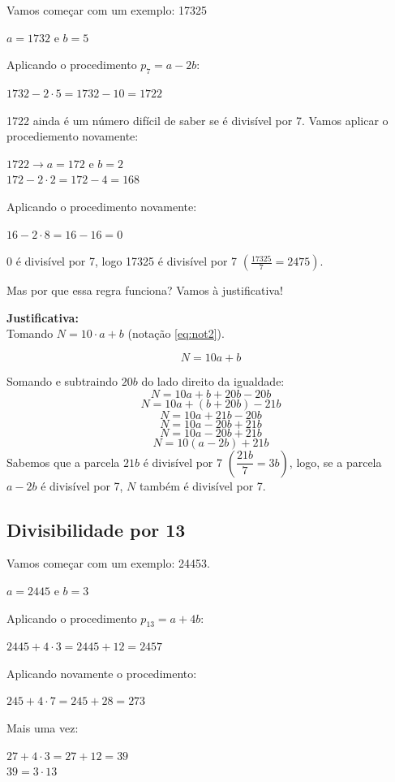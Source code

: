 \documentclass[12pt,a4paper]{article}
\begin{document}
		Vamos começar com um exemplo: 17325 
		
		$a = 1732$ e $b =5$
		
		Aplicando o procedimento $p_7 = a - 2b$:
		
		$1732 - 2 \cdot 5 = 1732 - 10 = 1722$
		
		1722 ainda é um número difícil de saber se é divisível por 7. Vamos aplicar o procediemento novamente:
		
		$1722 \longrightarrow a = 172$ e $b = 2$\\		
		$172 - 2 \cdot 2 = 172 - 4 = 168$
		
		Aplicando o procedimento novamente:
		
		$16 - 2 \cdot 8 = 16 - 16 = 0$
		
		0 é divisível por 7, logo 17325 é divisível por 7 $\left( \frac{17325}{7} = 2475 \right) $.
		
		Mas por que essa regra funciona? Vamos à justificativa!
		
		\textbf{Justificativa:}\\
		Tomando $N = 10 \cdot a + b$ (notação \ref{eq:not2}).
		
		$$N = 10a + b$$
		
		Somando e subtraindo $20b$ do lado direito da igualdade:		
		$$N = 10  a + b + 20b - 20b$$
		$$N = 10  a + (b + 20b) - 21b$$
		$$N = 10  a + 21b - 20b$$
		$$N = 10  a - 20b + 21b$$
		$$N = 10  a - 20b + 21b$$
		$$N = 10  (a - 2b) + 21b$$		
		Sabemos que a parcela $21b$ é divisível por 7 $\left(  \dfrac{21b}{7} = 3b \right) $, logo, se a parcela $a - 2b$ é divisível por 7, $N$ também é divisível por 7.
		
		\newpage
		
		\subsection{Divisibilidade por 13}
		
		Vamos começar com um exemplo: 24453.
		
		$a = 2445$ e $b =3$
		
		Aplicando o procedimento $p_{13} = a + 4b$:
		
		$2445 + 4 \cdot 3 = 2445 + 12 = 2457$
		
		Aplicando novamente o procedimento:
		
		$245 + 4 \cdot 7 = 245 + 28 = 273$
		
		Mais uma vez:
		
		$27 + 4 \cdot 3 = 27 + 12 = 39$\\		
		$39 = 3 \cdot 13$
		
\end{document}
